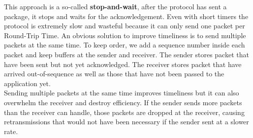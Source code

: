 This approach is a so-called \textbf{stop-and-wait}, after the protocol has sent a package, it stops and waits for the acknowledgement. Even with short timers the protocol is extremely slow and wasteful because it can only send one packet per Round-Trip Time. An obvious solution to improve timeliness is to send multiple packets at the same time. To keep order, we add a sequence number inside each packet and keep buffers at the sender and receiver. The sender stores packet that have been sent but not yet acknowledged. The receiver stores packet that have arrived out-of-sequence as well as those that have not been passed to the application yet.\\
Sending multiple packets at the same time improves timeliness but it can also overwhelm the receiver and destroy efficiency. If the sender sends more packets than the receiver can handle, those packets are dropped at the receiver, causing retransmissions that would not have been necessary if the sender sent at a slower rate.

